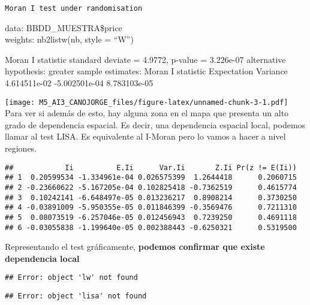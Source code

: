 \documentclass[
]{article}
\newenvironment{Shaded}{\begin{snugshade}}{\end{snugshade}}
\newcommand{\AttributeTok}[1]{\textcolor[rgb]{0.13,0.29,0.53}{#1}}
\newcommand{\FunctionTok}[1]{\textcolor[rgb]{0.13,0.29,0.53}{\textbf{#1}}}
\newcommand{\NormalTok}[1]{#1}
\newcommand{\SpecialCharTok}[1]{\textcolor[rgb]{0.81,0.36,0.00}{\textbf{#1}}}
\newcommand{\StringTok}[1]{\textcolor[rgb]{0.31,0.60,0.02}{#1}}
\begin{document}
\begin{verbatim}
Moran I test under randomisation
\end{verbatim}

data: BBDD\_MUESTRA\$price\\
weights: nb2listw(nb, style = ``W'')

Moran I statistic standard deviate = 4.9772, p-value = 3.226e-07
alternative hypothesis: greater sample estimates: Moran I statistic
Expectation Variance 4.614511e-02 -5.002501e-04 8.783103e-05

\begin{Shaded}
\end{Shaded}

\texttt{[image: M5\_AI3\_CANOJORGE\_files/figure-latex/unnamed-chunk-3-1.pdf]}
Para ver si además de esto, hay alguna zona en el mapa que presenta un
alto grado de dependencia espacial. Es decir, una dependencia espacial
local, podemos llamar al test LISA. Es equivalente al I-Moran pero lo
vamos a hacer a nivel regiones.

\begin{verbatim}
##            Ii          E.Ii      Var.Ii       Z.Ii Pr(z != E(Ii))
## 1  0.20599534 -1.334961e-04 0.026575399  1.2644418      0.2060715
## 2 -0.23660622 -5.167205e-04 0.102825418 -0.7362519      0.4615774
## 3  0.10242141 -6.648497e-05 0.013236217  0.8908214      0.3730250
## 4 -0.03891009 -5.950355e-05 0.011846399 -0.3569476      0.7211310
## 5  0.08073519 -6.257046e-05 0.012456943  0.7239250      0.4691118
## 6 -0.03055838 -1.199640e-05 0.002388443 -0.6250321      0.5319500
\end{verbatim}

Representando el test gráficamente, \textbf{podemos confirmar que existe
dependencia local}

\begin{verbatim}
## Error: object 'lw' not found
\end{verbatim}

\begin{verbatim}
## Error: object 'lisa' not found
\end{verbatim}
\end{document}
